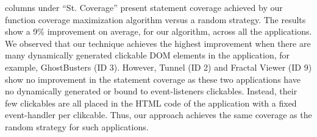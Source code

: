  columns under ``St. Coverage'' present \javascript statement coverage achieved by  our function coverage maximization algorithm versus a random strategy. The results show a 9\% improvement on average, for our algorithm, across all the applications. We observed that our technique achieves the highest improvement when there are many dynamically generated clickable DOM elements in the application, for example, GhostBusters (ID 3).
However, Tunnel (ID 2) and Fractal Viewer (ID 9) show no improvement in the statement coverage as these two applications have no dynamically generated or bound to event-listeners clickables. Instead, their few clickables are all placed in the HTML code of the application with a fixed event-handler per clikcable. Thus,  our approach achieves the same coverage as the random strategy for such applications. 



